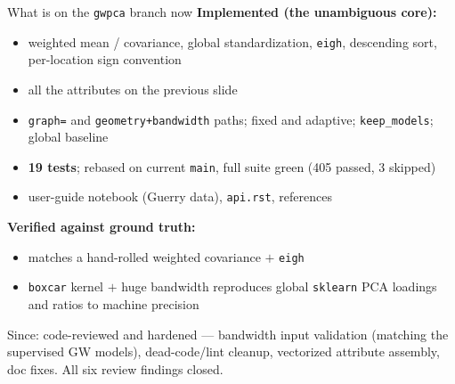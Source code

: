 \documentclass[10pt]{beamer}
\begin{document}
\begin{frame}{What is on the \texttt{gwpca} branch now}
  \textbf{Implemented (the unambiguous core):}
  \begin{itemize}
    \item weighted mean / covariance, global standardization, \texttt{eigh},
      descending sort, per-location sign convention
    \item all the attributes on the previous slide
    \item \texttt{graph=} and \texttt{geometry+bandwidth} paths; fixed and
      adaptive; \texttt{keep\_models}; global baseline
    \item \textbf{19 tests}; rebased on current \texttt{main}, full suite
      green (405 passed, 3 skipped)
    \item user-guide notebook (Guerry data), \texttt{api.rst}, references
  \end{itemize}
  \textbf{Verified against ground truth:}
  \begin{itemize}
    \item matches a hand-rolled weighted covariance $+$ \texttt{eigh}
    \item \texttt{boxcar} kernel $+$ huge bandwidth reproduces global
      \texttt{sklearn} PCA loadings and ratios to machine precision
  \end{itemize}
  \vspace{0.3em}
  \footnotesize Since: code-reviewed and hardened --- bandwidth input
  validation (matching the supervised GW models), dead-code/lint cleanup,
  vectorized attribute assembly, doc fixes. All six review findings closed.
\end{frame}
\end{document}
